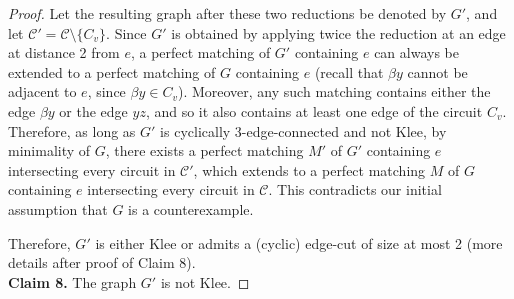 \documentclass[]{theclass}
\begin{document}
\begin{proof}
Let the resulting graph after these two reductions be denoted by $G'$, and let $\mathcal{C}'=\mathcal{C}\setminus\{C_v\}$.
Since $G'$ is obtained by applying twice the reduction at an edge at distance 2 from $e$, a perfect matching of $G'$ containing $e$ can always be extended to a perfect matching of $G$ containing $e$ (recall that $\beta y$ cannot be adjacent to $e$, since $\beta y\in C_v$). 
Moreover, any such matching contains either the edge $\beta y$ or the edge $yz$, and so it also contains at least one edge of the circuit $C_v$. Therefore, as long as $G'$ is cyclically 3-edge-connected and not Klee, by minimality of $G$, there exists a perfect matching $M'$ of $G'$ containing $e$ intersecting every circuit in $\mathcal{C}'$, which extends to a perfect matching $M$ of $G$ containing $e$ intersecting every circuit in $\mathcal{C}$. This contradicts our initial assumption that $G$ is a counterexample. 

Therefore, $G'$ is either Klee or admits a (cyclic) edge-cut of size at most 2 (more details after proof of Claim 8). \\

\noindent\textbf{Claim 8.} The graph $G'$ is not Klee.


\end{proof}
\end{document}
